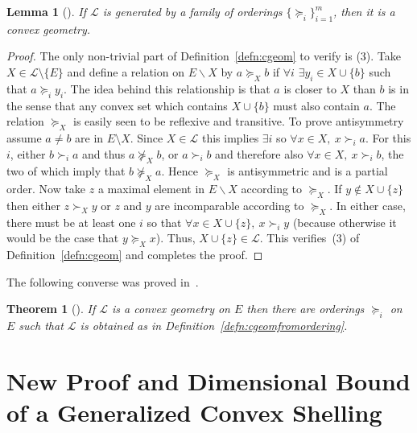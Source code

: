 \documentclass[12pt]{elsarticle}
\theoremstyle{plain}
\newtheorem{theorem}{Theorem}
\newtheorem{lemma}{Lemma}
\theoremstyle{definition}
\newcommand{\cgeom}{\mathcal{L}}
\begin{document}
\begin{lemma}[]\label{lem:LisomL1}
If $\cgeom$ is generated by a family of orderings $\{\succcurlyeq_{i}\}_{i=1}^{m}$, then it is a convex geometry.
\end{lemma}
\begin{proof}
The only non-trivial part of Definition~\ref{defn:cgeom} to verify is (3). Take $X\in\cgeom\setminus\{E\}$ and define a relation on $E \backslash X$ by  $a \succcurlyeq_X b$ if $\forall  i$  $\exists y_i \in X \cup \{b\}$ such that $a \succcurlyeq_i y_i$. The idea behind this relationship is that $a$ is closer to $X$ than $b$ is in the sense that any convex set which contains $X \cup \{b\}$ must also contain $a$. The relation $\succcurlyeq_X$ is easily seen to be reflexive and transitive. To prove antisymmetry assume $a\neq b$ are in $E\setminus X$.  Since $X\in\cgeom$ this implies $\exists i$ so $\forall x \in X,\ x \succ_i a$. For this $i$, either $b\succ_{i}a$ and thus  $a\not\succcurlyeq_{X}b$, or $a\succ_{i} b$ and therefore also $\forall x \in X,\ x \succ_i b$, the two of which imply that $b\not\succcurlyeq_{X}a$.  Hence $\succcurlyeq_{X}$ is antisymmetric and is a partial order. Now take $z$ a maximal element in $E \backslash X$ according to $\succcurlyeq_X$. If $y\not \in X\cup\{z\}$ then either $z \succ_X y$ or $z$ and $y$ are incomparable according to $\succcurlyeq_X$. In either case, there must be at least one $i$ so that $\forall x \in X \cup \{z\},\ x \succ_{i}y$ (because otherwise it would be the case that $y \succcurlyeq_X x$). Thus, $X \cup \{z\} \in \cgeom$.  This verifies~(3) of Definition~\ref{defn:cgeom} and completes the proof.
\end{proof}
The following converse was proved in~\cite{EJ}.

\begin{theorem}[]\label{thm:EJ}
If $\cgeom$ is a convex geometry on $E$ then there are orderings $\succcurlyeq_{i}$ on $E$ such that $\cgeom$ is obtained  as in Definition~\ref{defn:cgeomfromordering}.
\end{theorem}

\section{New Proof and Dimensional Bound of a Generalized Convex Shelling}\label{sec:newproof}
\end{document}
